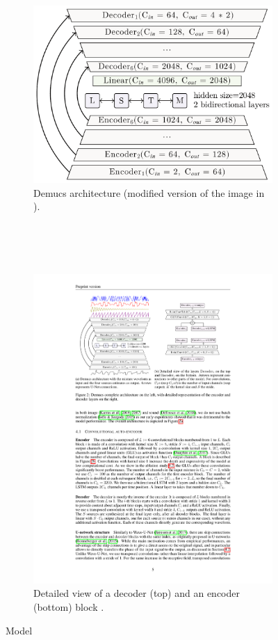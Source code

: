 \documentclass[12pt]{article}
\begin{document}
\begin{figure}[h!]
\centering

\begin{subfigure}{1\textwidth}
  \captionsetup{justification=centering}
  \centering
  \includegraphics[width=.7\linewidth]{modelA}
  \caption{Demucs architecture (modified version of the image in \cite{Defossez_2019}).}
  \label{fig:modelA}
\end{subfigure}%

~\\~\\~

\begin{subfigure}{1\textwidth}
  \captionsetup{justification=centering}
  \centering
  \includegraphics[width=.5\linewidth]{modelB}
  \caption{Detailed view of a decoder (top) and an encoder (bottom) block \cite{Defossez_2019}.}
  \label{fig:modelB}
\end{subfigure}

\caption{Model}
\label{fig:model}
\end{figure}
\end{document}
